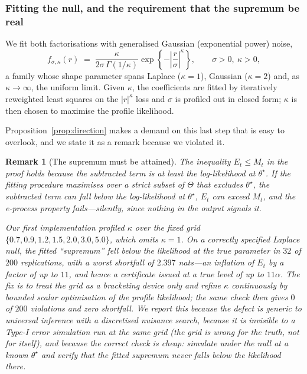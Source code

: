 \documentclass[pdflatex,sn-apa]{sn-jnl}
\theoremstyle{thmstyleone}%
\theoremstyle{thmstyletwo}%
\newtheorem{remark}{Remark}%
\theoremstyle{thmstylethree}%
\begin{document}
\subsubsection{Fitting the null, and the requirement that the supremum be real}
\label{sec:supremum}

We fit both factorisations with generalised Gaussian (exponential power)
noise,
\begin{equation}\label{eq:gg}
f_{\sigma,\kappa}(r) \;=\;
  \frac{\kappa}{2\sigma\,\Gamma(1/\kappa)}
  \exp\!\left\{ -\left|\frac{r}{\sigma}\right|^{\kappa} \right\},
\qquad \sigma > 0, \ \kappa > 0,
\end{equation}
a family \citep{subbotin1923law,box1973bayesian} whose shape parameter spans
Laplace ($\kappa = 1$), Gaussian ($\kappa = 2$) and, as
$\kappa \to \infty$, the uniform limit. Given $\kappa$, the coefficients are
fitted by iteratively reweighted least squares on the $|r|^\kappa$ loss and
$\sigma$ is profiled out in closed form; $\kappa$ is then chosen to maximise
the profile likelihood.

Proposition~\ref{prop:direction} makes a demand on this last step that is easy
to overlook, and we state it as a remark because we violated it.

\begin{remark}[The supremum must be attained]\label{rem:supremum}
The inequality $E_t \le M_t$ in the proof holds because the subtracted term is
at least the log-likelihood at $\theta^\star$. If the fitting procedure
maximises over a strict subset of $\Theta$ that excludes $\theta^\star$, the
subtracted term can fall \emph{below} the log-likelihood at $\theta^\star$,
$E_t$ can exceed $M_t$, and the e-process property fails---silently, since
nothing in the output signals it.

Our first implementation profiled $\kappa$ over the fixed grid
$\{0.7, 0.9, 1.2, 1.5, 2.0, 3.0, 5.0\}$, which omits $\kappa = 1$. On a
correctly specified Laplace null, the fitted ``supremum'' fell below the
likelihood at the true parameter in $32$ of $200$ replications, with a worst
shortfall of $2.397$ nats---an inflation of $E_t$ by a factor of up to $11$,
and hence a certificate issued at a true level of up to $11\alpha$. The fix is
to treat the grid as a bracketing device only and refine $\kappa$ continuously
by bounded scalar optimisation of the profile likelihood; the same check then
gives $0$ of $200$ violations and zero shortfall. We report this because the
defect is generic to universal inference with a discretised nuisance search,
because it is invisible to a Type-I error simulation run at the same grid (the
grid is wrong for the truth, not for itself), and because the correct check is
cheap: simulate under the null at a known $\theta^\star$ and verify that the
fitted supremum never falls below the likelihood there.
\end{remark}
\end{document}
